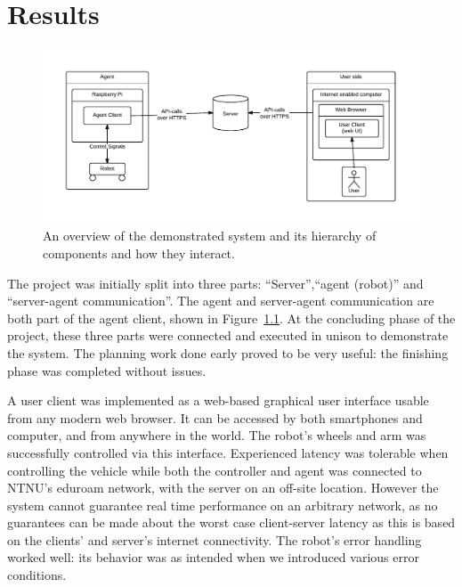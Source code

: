 \chapter{Results}
\begin{figure}[H]
\centering
\includegraphics[width=\textwidth]{graphics/robot-implementation.pdf}
\caption{An overview of the demonstrated system and its hierarchy of components and how they interact.}
\label{fig:robot-implementation}
\end{figure}

The project was initially split into three parts:
``Server'',``agent (robot)'' and ``server-agent communication''.
The agent and server-agent communication are both part of the agent client, shown in Figure~\ref{fig:robot-implementation}.
At the concluding phase of the project, these three parts were connected and executed in unison to demonstrate the system.
The planning work done early proved to be very useful: the finishing phase was completed without issues.

A user client was implemented as a web-based graphical user interface usable from any modern web browser.
It can be accessed by both smartphones and computer, and from anywhere in the world. 
The robot's wheels and arm was successfully controlled via this interface.
Experienced latency was tolerable when controlling the vehicle while both the controller and agent was connected to NTNU's eduroam network, with the server on an off-site location.
However the system cannot guarantee real time performance on an arbitrary network, as no guarantees can be made about the worst case client-server latency as this is based on the clients' and server's internet connectivity.
The robot's error handling worked well: its behavior was as intended when we introduced various error conditions.

